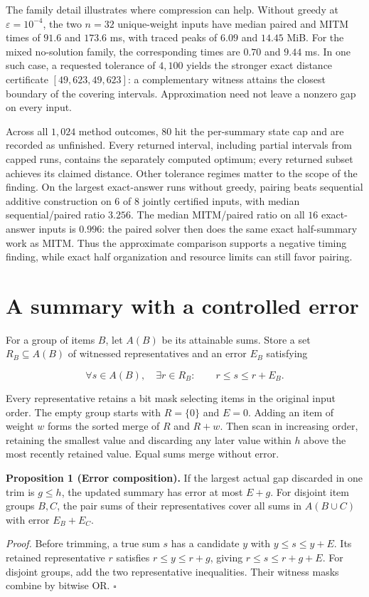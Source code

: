 \documentclass[10pt,english]{article}
\begin{document}
The family detail illustrates where compression can help. Without greedy at \(\varepsilon=10^{-4}\), the two \(n=32\) unique-weight inputs have median paired and MITM times of \(91.6\) and \(173.6\) ms, with traced peaks of \(6.09\) and \(14.45\) MiB. For the mixed no-solution family, the corresponding times are \(0.70\) and \(9.44\) ms. In one such case, a requested tolerance of \(4{,}100\) yields the stronger exact distance certificate \([49{,}623,49{,}623]\): a complementary witness attains the closest boundary of the covering intervals. Approximation need not leave a nonzero gap on every input.

Across all \(1{,}024\) method outcomes, \(80\) hit the per-summary state cap and are recorded as unfinished. Every returned interval, including partial intervals from capped runs, contains the separately computed optimum; every returned subset achieves its claimed distance. Other tolerance regimes matter to the scope of the finding. On the largest exact-answer runs without greedy, pairing beats sequential additive construction on \(6\) of \(8\) jointly certified inputs, with median sequential/paired ratio \(3.256\). The median MITM/paired ratio on all \(16\) exact-answer inputs is \(0.996\): the paired solver then does the same exact half-summary work as MITM. Thus the approximate comparison supports a negative timing finding, while exact half organization and resource limits can still favor pairing.

\section{A summary with a controlled error}
For a group of items \(B\), let \(A(B)\) be its attainable sums. Store a set \(R_B\subseteq A(B)\) of witnessed representatives and an error \(E_B\) satisfying
\begin{tcolorbox}[paperbox]
\[
\forall s\in A(B),\quad\exists r\in R_B:
\qquad r\le s\le r+E_B.
\]
\end{tcolorbox}
Every representative retains a bit mask selecting items in the original input order. The empty group starts with \(R=\{0\}\) and \(E=0\). Adding an item of weight \(w\) forms the sorted merge of \(R\) and \(R+w\). Then scan in increasing order, retaining the smallest value and discarding any later value within \(h\) above the most recently retained value. Equal sums merge without error.

\begin{tcolorbox}[accentbox]
\textbf{Proposition 1 (Error composition).} If the largest actual gap discarded in one trim is \(g\le h\), the updated summary has error at most \(E+g\). For disjoint item groups \(B,C\), the pair sums of their representatives cover all sums in \(A(B\cup C)\) with error \(E_B+E_C\).
\end{tcolorbox}
\textit{Proof.} Before trimming, a true sum \(s\) has a candidate \(y\) with \(y\le s\le y+E\). Its retained representative \(r\) satisfies \(r\le y\le r+g\), giving \(r\le s\le r+g+E\). For disjoint groups, add the two representative inequalities. Their witness masks combine by bitwise OR. \hfill\(\square\)
\end{document}

